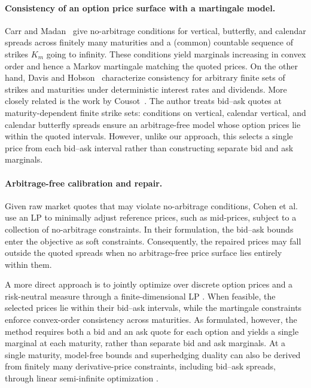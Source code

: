 \documentclass[11pt]{article}
\theoremstyle{plain}
\theoremstyle{definition}
\theoremstyle{remark}
\theoremstyle{plain}
\begin{document}
\paragraph{Consistency of an option price surface with a martingale model.}
Carr and Madan~\cite{CarrMadan2005} give no-arbitrage conditions for vertical, butterfly, and calendar spreads across finitely many maturities and a (common) countable sequence of strikes $K_m$ going to infinity. These conditions yield marginals increasing in convex order and hence a Markov martingale matching the quoted prices. On the other hand, Davis and Hobson~\cite{DavisHobson2007} characterize consistency for arbitrary finite sets of strikes and maturities under deterministic interest rates and dividends. More closely
related is the work by Cousot~\cite{Cousot2007}. The author treats bid--ask quotes at maturity-dependent finite strike sets: conditions on vertical, calendar vertical, and calendar butterfly spreads ensure an arbitrage-free model whose option prices lie within the quoted intervals. However, unlike our approach, this selects a single price from each bid--ask interval rather than constructing separate bid and ask marginals.


\paragraph{Arbitrage-free calibration and repair.}
Given raw market quotes that may violate no-arbitrage conditions, Cohen et al.~\cite{CohenReisingerWang2020} use an LP to minimally adjust reference prices, such as mid-prices, subject to a collection of no-arbitrage constraints. In their formulation, the bid--ask bounds enter the objective as soft constraints. Consequently, the repaired prices may fall outside the quoted spreads when no arbitrage-free price surface lies entirely within them.

A more direct approach is to jointly optimize over discrete option prices and a risk-neutral measure through a finite-dimensional LP \cite{BayraktarHanNorgilas2026}. When feasible, the selected prices lie within their bid--ask intervals, while the martingale constraints enforce convex-order consistency across maturities. As formulated, however, the method requires both a bid and an ask quote for each option and yields a single marginal at each maturity, rather than separate bid and ask marginals. At a single maturity, model-free bounds and superhedging duality can also be derived from finitely many derivative-price constraints, including bid--ask spreads, through linear semi-infinite optimization \cite{NeufeldAntonisXiang2023}.
\end{document}
